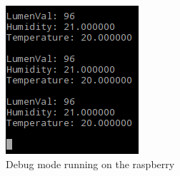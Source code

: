 \documentclass[10pt]{article}
\begin{document}
\begin{figure}[H]
  \centering
  \includegraphics[max width=\textwidth]{../imgs/debugMode.png}
  \caption{\label{debugMode}Debug mode running on the raspberry}
\end{figure}
\end{document}

